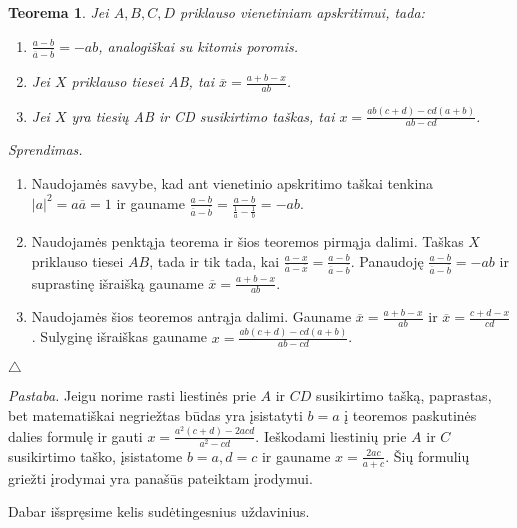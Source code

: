 \documentclass[11pt,a4paper,twoside]{book}
\newenvironment{sprendimas}{\noindent \textit{Sprendimas.}}{\hfill $\triangle$}
\newtheorem{thmnr}{Teorema}
\theoremstyle{definition} \newtheorem*{api}{Apibrėžimas}
\theoremstyle{remark} \newtheorem*{pastaba}{Pastaba}
\begin{document}
\begin{thmnr}  Jei $A, B, C, D$ priklauso vienetiniam apskritimui, tada:\
\begin{enumerate}
\item $\frac{a - b}{\overline{a} -\overline{b}}=-ab$, analogiškai su kitomis poromis.
\item Jei $X$ priklauso tiesei AB, tai $\overline{x}=\frac{a + b - x}{ab}$.
\item Jei $X$ yra tiesių AB ir CD susikirtimo taškas, tai $x=\frac{ab(c+d) - cd(a+b)}{ab - cd}$.
\end{enumerate}
\end{thmnr}
\begin{sprendimas}
\begin{enumerate} 
\item Naudojamės savybe, kad ant vienetinio apskritimo taškai tenkina $|a|^2=a\overline{a}=1$ ir gauname $\frac{a - b}{\overline{a} -\overline{b}}=\frac{a - b}{\frac{1}{a} -\frac{1}{b}}=-ab$.
\item Naudojamės penktąja teorema ir šios teoremos pirmąja dalimi. Taškas $X$ priklauso tiesei $AB$, tada ir tik tada, kai $\frac{a-x}{\overline{a}-\overline{x}}=\frac{a-b}{\overline{a}-\overline{b}}$. Panaudoję $\frac{a - b}{\overline{a} -\overline{b}}=-ab$ ir suprastinę išraišką gauname $\overline{x}=\frac{a + b - x}{ab}$.
\item Naudojamės šios teoremos antrąja dalimi. Gauname $\overline{x}=\frac{a + b - x}{ab}$ ir $\overline{x}=\frac{c+ d - x}{cd}$. Sulyginę išraiškas gauname $x=\frac{ab(c+d) - cd(a+b)}{ab - cd}$.
\end{enumerate}
\end{sprendimas}

\textit {Pastaba.} Jeigu norime rasti liestinės prie $A$ ir $CD$ susikirtimo tašką, paprastas, bet matematiškai negriežtas būdas yra įsistatyti $b=a$ į teoremos paskutinės dalies formulę ir gauti $x=\frac{a^2(c+d) - 2acd}{a^2 - cd}$. Ieškodami liestinių prie $A$ ir $C$ susikirtimo taško, įsistatome $b=a, d=c$ ir gauname $x=\frac{2ac}{a+c}$. Šių formulių griežti įrodymai yra panašūs pateiktam įrodymui.
\bigskip

Dabar išspręsime kelis sudėtingesnius uždavinius.



  
\end{document}
